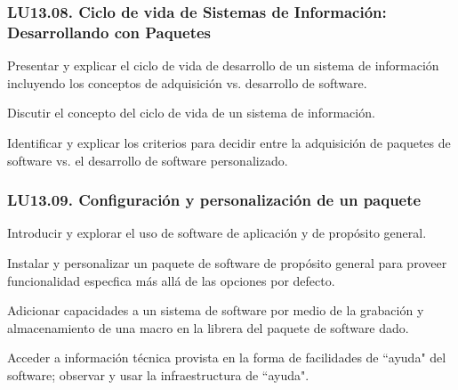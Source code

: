 \subsubsection{LU13.08. Ciclo de vida de Sistemas de Información: Desarrollando con Paquetes}\label{sec:LU13.08}
\begin{LearningUnit}
\begin{LUGoal}
\item Presentar y explicar el ciclo de vida de desarrollo de un sistema de información incluyendo los conceptos de adquisición vs. desarrollo de software.
\end{LUGoal}

\begin{LUObjective}
\item Discutir el concepto del ciclo de vida de un sistema de información.
\item Identificar y explicar los criterios para decidir entre la adquisición de paquetes de software vs. el desarrollo de software personalizado.
\end{LUObjective}
\end{LearningUnit}

\subsubsection{LU13.09. Configuración y personalización de un paquete}\label{sec:LU13.09}
\begin{LearningUnit}
\begin{LUGoal}
\item Introducir y explorar el uso de software de aplicación y de propósito general.
\end{LUGoal}

\begin{LUObjective}
\item Instalar y personalizar un paquete de software de propósito general para proveer funcionalidad espec­fica más allá de las opciones por defecto.
\item Adicionar capacidades a un sistema de software por medio de la grabación y almacenamiento de una macro en la librer­a del paquete de software dado.
\item Acceder a información técnica provista en la forma de facilidades de ``ayuda" del software; observar y usar la infraestructura de ``ayuda".
\end{LUObjective}
\end{LearningUnit}

